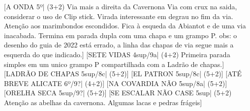 \begin{CGSectorRoutes}
    [A ONDA 5º| (3+2) Via mais a direita da Cavernona Via com crux na saida, considerar o uso de Clip stick. Virada interessante em degrau no fim da via. Atenção aos marimbondos escondidos. Fica à esqueda da Abiantot e de uma via inacabada. Termina em parada dupla com uma chapa e um grampo P. obs: o desenho do guia de 2022 está errado, a linha das chapas de via segue mais a esquerda do que indicado.]
    [SETE VIDAS 4sup/9a| (4+2) Primeira parada simples em um unico grampo P compartilhada com a Ladrão de chapas.]
    [LADRÃO DE CHAPAS 5sup/8c| (5+2)]
    [EL PATRON 5sup/8c| (5+2)]
    [ATÉ BREVE ALICATE 6º/9?| (4+2)]
    [NA COVARDIA NÃO 5sup/8a| (5+2)]
    [ORELHA SECA 5sup/9?| (5+2)]
    [SE ESCALAR NÃO CASE 5sup| (5+2) Atenção as abelhas da cavernona. Algumas lacas e pedras frágeis]
\end{CGSectorRoutes}

